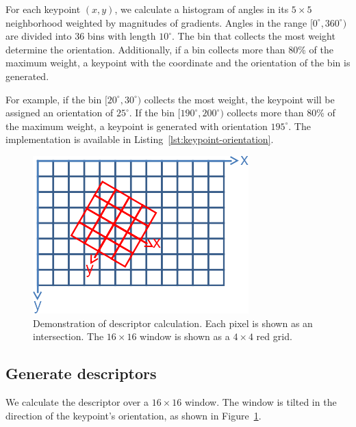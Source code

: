 \documentclass{ee208report}
\begin{document}
\begin{multicols*}{2}
For each keypoint $(x, y)$, we calculate a histogram of angles in its $5 \times
5$ neighborhood weighted by magnitudes of gradients. Angles in the range
$[0^\circ, 360^\circ)$ are divided into 36 bins with length $10^\circ$. The bin
that collects the most weight determine the orientation. Additionally, if a bin
collects more than 80\% of the maximum weight, a keypoint with the coordinate
and the orientation of the bin is generated.

For example, if the bin $[20^\circ, 30^\circ)$ collects the most weight, the
keypoint will be assigned an orientation of $25^\circ$. If the bin $[190^\circ,
200^\circ)$ collects more than 80\% of the maximum weight, a keypoint is
generated with orientation $195^\circ$. The implementation is available in
Listing~\ref{lst:keypoint-orientation}.

\begin{figure}[H]
    \includegraphics[width=\linewidth]{images/descriptor_grid.png}
    \caption{Demonstration of descriptor calculation. Each pixel is shown as an
        intersection. The $16 \times 16$ window is shown as a $4 \times 4$ red
        grid.}
    \label{fig:descriptor-grid}
\end{figure}

\subsection{Generate descriptors}

We calculate the descriptor over a $16 \times 16$ window. The window is tilted
in the direction of the keypoint's orientation, as shown in
Figure~\ref{fig:descriptor-grid}.


\end{multicols*}
\end{document}
